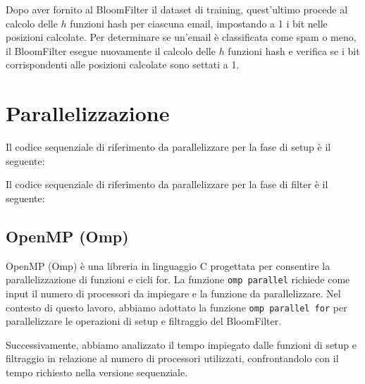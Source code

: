\documentclass[11pt]{article}
\begin{document}
    Dopo aver fornito al BloomFilter il dataset di training, quest'ultimo procede al calcolo delle $h$ funzioni hash per ciascuna email,
    impostando a 1 i bit nelle posizioni calcolate.
    Per determinare se un'email è classificata come spam o meno, il BloomFilter esegue nuovamente il calcolo delle $h$
    funzioni hash e verifica se i bit corrispondenti alle posizioni calcolate sono settati a 1.

    \section{Parallelizzazione}\label{sec:parallelizazzione}
    Il codice sequenziale di riferimento da parallelizzare per la fase di setup è il seguente:
    
    

    Il codice sequenziale di riferimento da parallelizzare per la fase di filter è il seguente:
    
    

    \subsection{OpenMP (Omp)}\label{subsec:omp}
    OpenMP (Omp) è una libreria in linguaggio C progettata per consentire la parallelizzazione di funzioni e cicli for.
    La funzione \texttt{omp parallel} richiede come input il numero di processori da impiegare e la funzione da parallelizzare.
    Nel contesto di questo lavoro, abbiamo adottato la funzione \texttt{omp parallel for} per parallelizzare le operazioni
    di setup e filtraggio del BloomFilter.

    Successivamente, abbiamo analizzato il tempo impiegato dalle funzioni di setup e filtraggio in relazione al numero
    di processori utilizzati, confrontandolo con il tempo richiesto nella versione sequenziale.
    
\end{document}
